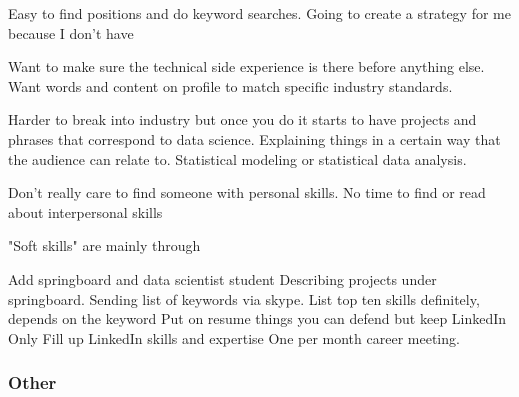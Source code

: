 Easy to find positions and do keyword searches. Going to create a strategy for me because I don't have 

Want to make sure the technical side experience is there before anything else. Want words and content on profile to match specific industry standards.

Harder to break into industry but once you do it starts to have projects and phrases that correspond to data science. 
Explaining things in a certain way that the audience can
relate to.
Statistical modeling or statistical data analysis.


Don't really care to find someone with personal skills.
No time to find or read about interpersonal skills 

"Soft skills" are mainly through 

Add springboard and data scientist student 
Describing projects under springboard.
Sending list of keywords via skype. 
List top ten skills definitely, depends on the keyword
Put on resume things you can defend but keep LinkedIn
Only Fill up LinkedIn skills and expertise 
One per month career meeting. 


\subsubsection{Other}